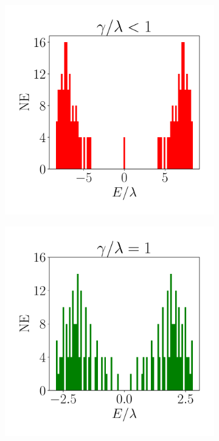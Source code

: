 \begin{figure}[h!]
     \centering
    \captionsetup[sub]{font=small}
     \begin{subfigure}[b!]{0.3 \textwidth}
         \caption{}
         \includegraphics[width=\textwidth]{Imagenes/Resultados_Hoti_Cuadrado/bars_square1.pdf}
         \label{}
     \end{subfigure}\hspace*{1em}
     \begin{subfigure}[b!]{0.3 \textwidth}
         \caption{}
         \includegraphics[width=\textwidth]{Imagenes/Resultados_Hoti_Cuadrado/bars_square2.pdf}

\end{subfigure}
\end{figure}
